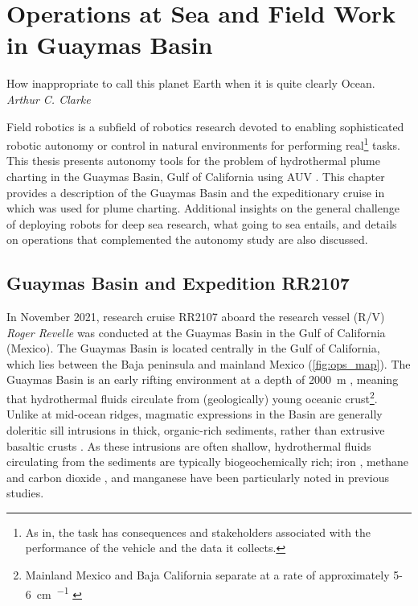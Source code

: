 \chapter{Operations at Sea and Field Work in Guaymas Basin}
\label{chap:opsatsea}

\begin{center}
    \begin{minipage}{0.6\textwidth}
      \begin{small}
        How inappropriate to call this planet Earth when it is quite clearly Ocean.\\ \emph{Arthur C. Clarke}
      \end{small}
    \end{minipage}
    \vspace{0.5cm}
\end{center}

Field robotics is a subfield of robotics research devoted to enabling sophisticated robotic autonomy or control in natural environments for performing real\footnote{As in, the task has consequences and stakeholders associated with the performance of the vehicle and the data it collects.} tasks.
This thesis presents autonomy tools for the problem of hydrothermal plume charting in the Guaymas Basin, Gulf of California using AUV \Sentry. 
This chapter provides a description of the Guaymas Basin and the expeditionary cruise in which \Sentry was used for plume charting.
Additional insights on the general challenge of deploying robots for deep sea research, what going to sea entails, and details on operations that complemented the autonomy study are also discussed. 

\section{Guaymas Basin and Expedition RR2107}
\label{sec:guaymas_description}
In November 2021, research cruise RR2107 aboard the research vessel (R/V) \emph{Roger Revelle} was conducted at the Guaymas Basin in the Gulf of California (Mexico).
The Guaymas Basin is located centrally in the Gulf of California, which lies between the Baja peninsula and mainland Mexico (\cref{fig:ops_map}).
The Guaymas Basin is an early rifting environment at a depth of \SI{2000}{\meter} \autocite{scholz2019shelf,moore1982geologic,teske2016guaymas}, meaning that hydrothermal fluids circulate from (geologically) young oceanic crust\footnote{Mainland Mexico and Baja California separate at a rate of approximately 5-\SI{6}{\cm\per\year} \autocite{lonsdale1985hydrothermal}}.
Unlike at mid-ocean ridges, magmatic expressions in the Basin are generally doleritic sill intrusions in thick, organic-rich sediments, rather than extrusive basaltic crusts \autocite{lonsdale1985hydrothermal,teske2019characteristics}.
As these intrusions are often shallow, hydrothermal fluids circulating from the sediments are typically biogeochemically rich; iron \autocite{scholz2019shelf}, methane and carbon dioxide \autocite{geilert2018formation}, and manganese \autocite{campbell1988manganese} have been particularly noted in previous studies.



